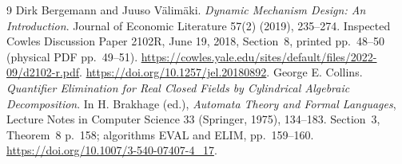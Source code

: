 \documentclass[11pt,a4paper]{article}
\begin{document}
\begin{thebibliography}{9}
Dirk Bergemann and Juuso V\"alim\"aki.
\emph{Dynamic Mechanism Design: An Introduction}.
Journal of Economic Literature 57(2) (2019), 235--274.
Inspected Cowles Discussion Paper 2102R, June 19, 2018, Section~8,
printed pp.~48--50 (physical PDF pp.~49--51).
\url{https://cowles.yale.edu/sites/default/files/2022-09/d2102-r.pdf}.
\url{https://doi.org/10.1257/jel.20180892}.
George E. Collins.
\emph{Quantifier Elimination for Real Closed Fields by Cylindrical
Algebraic Decomposition}.
In H. Brakhage (ed.), \emph{Automata Theory and Formal Languages},
Lecture Notes in Computer Science 33 (Springer, 1975), 134--183.
Section~3, Theorem~8 p.~158; algorithms EVAL and ELIM, pp.~159--160.
\url{https://doi.org/10.1007/3-540-07407-4_17}.
\end{thebibliography}
\end{document}
